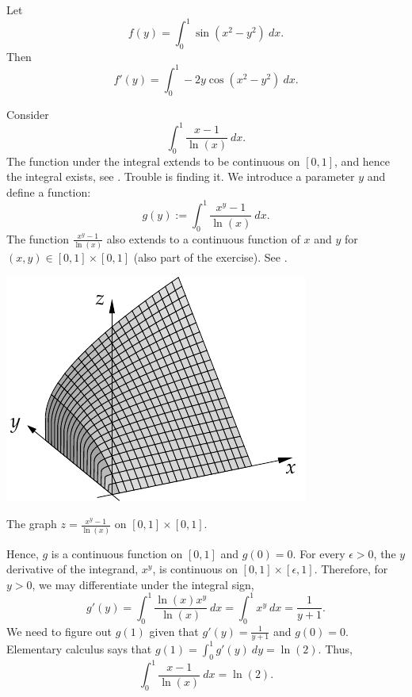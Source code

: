 \begin{example}
Let
\begin{equation*}
f(y) = \int_0^1 \sin(x^2-y^2) ~dx .
\end{equation*}
Then
\begin{equation*}
f'(y) = \int_0^1 -2y\cos(x^2-y^2) ~dx .
\end{equation*}
\end{example}

\begin{example} \label{example:counterexamplediffunder}
Consider
\begin{equation*}
\int_0^{1} \frac{x-1}{\ln(x)} ~dx .
\end{equation*}
The function under the integral 
extends to be continuous on $[0,1]$, and hence
the integral exists, see .  Trouble is finding it.
We introduce a parameter $y$
and define a function:
\begin{equation*}
g(y) := \int_0^{1} \frac{x^y-1}{\ln(x)} ~dx .
\end{equation*}
The function
$\frac{x^y-1}{\ln(x)}$
also extends to a continuous function of $x$ and $y$
for $(x,y) \in [0,1] \times [0,1]$ (also part of the exercise).
See .
\begin{myfigureht}
\includegraphics{figures/diffunderexample}
\caption{The graph $z= \frac{x^y-1}{\ln(x)}$ on $[0,1] \times [0,1]$.\label{fig:diffunderexample}}
\end{myfigureht}


Hence,
$g$ is a continuous function on $[0,1]$ and $g(0) = 0$.
For every $\epsilon > 0$, the $y$ derivative of the integrand, $x^y$,
is continuous on $[0,1] \times [\epsilon,1]$.  Therefore,
for $y >0$, we may differentiate under the integral sign,
\begin{equation*}
g'(y) =
\int_0^{1} \frac{\ln(x) x^y}{\ln(x)} ~dx 
=
\int_0^{1} x^y ~dx =
\frac{1}{y+1} .
\end{equation*}
We need to figure out $g(1)$ given that $g'(y) = \frac{1}{y+1}$ and $g(0) =
0$.  Elementary calculus says that $g(1) = \int_0^1 g'(y)~dy = \ln(2)$.
Thus,
\begin{equation*}
\int_0^{1} \frac{x-1}{\ln(x)} ~dx  = \ln(2).
\end{equation*}
\end{example}

